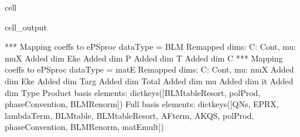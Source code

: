\documentclass[letterpaper,table,10pt,english]{jupyterBook}
\begin{document}
\begin{sphinxuseclass}{cell}
\begin{sphinxVerbatimOutput}
\begin{sphinxuseclass}{cell_output}
\begin{sphinxVerbatim}[commandchars=\\\{\}]
*** Mapping coeffs to ePSproc dataType = BLM
Remapped dims: \PYGZob{}\PYGZsq{}C\PYGZsq{}: \PYGZsq{}Cont\PYGZsq{}, \PYGZsq{}mu\PYGZsq{}: \PYGZsq{}muX\PYGZsq{}\PYGZcb{}
Added dim Eke
Added dim P
Added dim T
Added dim C
*** Mapping coeffs to ePSproc dataType = matE
Remapped dims: \PYGZob{}\PYGZsq{}C\PYGZsq{}: \PYGZsq{}Cont\PYGZsq{}, \PYGZsq{}mu\PYGZsq{}: \PYGZsq{}muX\PYGZsq{}\PYGZcb{}
Added dim Eke
Added dim Targ
Added dim Total
Added dim mu
Added dim it
Added dim Type
Product basis elements: dict\PYGZus{}keys([\PYGZsq{}BLMtableResort\PYGZsq{}, \PYGZsq{}polProd\PYGZsq{}, \PYGZsq{}phaseConvention\PYGZsq{}, \PYGZsq{}BLMRenorm\PYGZsq{}])
Full basis elements: dict\PYGZus{}keys([\PYGZsq{}QNs\PYGZsq{}, \PYGZsq{}EPRX\PYGZsq{}, \PYGZsq{}lambdaTerm\PYGZsq{}, \PYGZsq{}BLMtable\PYGZsq{}, \PYGZsq{}BLMtableResort\PYGZsq{}, \PYGZsq{}AFterm\PYGZsq{}, \PYGZsq{}AKQS\PYGZsq{}, \PYGZsq{}polProd\PYGZsq{}, \PYGZsq{}phaseConvention\PYGZsq{}, \PYGZsq{}BLMRenorm\PYGZsq{}, \PYGZsq{}matEmult\PYGZsq{}])
\end{sphinxVerbatim}

\end{sphinxuseclass}\end{sphinxVerbatimOutput}

\end{sphinxuseclass}
\end{document}
